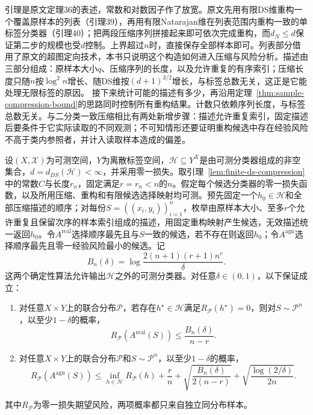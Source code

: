 引理是原文定理36的表述，常数和对数因子作了放宽。原文先用有限DS维重构一个覆盖原样本的列表（引理39），再用有限Natarajan维在列表范围内重构一致的单标签分类器（引理40）；把两段压缩序列拼接起来即可依次完成重构，而$d_N\leq d$保证第二步的规模也受$d$控制。上界超过$n$时，直接保存全部样本即可。列表部分借用了原文的超图定向技术，本书只说明这个构造如何进入压缩与风险分析。描述由三部分组成：原样本大小$q$、压缩序列的长度，以及允许重复的有序索引；压缩长度只随$n$按$\log^2n$增长、随DS维按$(d+1)^{3/2}$增长，与标签总数无关，这正是它能处理无限标签的原因。
接下来统计可能的描述有多少，再沿用定理~\ref{thm:sample-compression-bound}的思路同时控制所有重构结果。计数只依赖序列长度，与标签总数无关。与二分类一致压缩相比有两处新增步骤：描述允许重复索引，固定描述后要条件于它实际读取的不同观测；不可知情形还要证明重构候选中存在经验风险不高于类内参照者，并计入读取样本造成的偏差。

\begin{theorem}[有限DS维的期望风险保证]
\label{thm:finite-ds-learning-rates}
设$(X,\mathcal X)$为可测空间，$Y$为离散标签空间，$\mathcal H\subseteq Y^X$是由可测分类器组成的非空集合，$d=d_{DS}(\mathcal H)<\infty$，并采用零一损失。取引理~\ref{lem:finite-ds-compression}中的常数$C$与长度$r_n$，固定满足$r=r_n<n$的$n$。假定每个候选分类器的零一损失函数，以及所用压缩、重构和有限候选选择映射均可测。预先固定一个$h_0\in\mathcal H$和全部压缩描述的顺序；对每份$S=((x_i,y_i))_{i=1}^n$，枚举由原样本大小、至多$r$个允许重复且保留次序的样本索引组成的描述，用固定重构映射产生候选，无效描述统一返回$h_0$。令$A^{\mathrm{real}}$选择顺序最先且与$S$一致的候选，若不存在则返回$h_0$；令$A^{\mathrm{agn}}$选择顺序最先且零一经验风险最小的候选。记
\[
 B_n(\delta)=\log\frac{2(n+1)(r+1)n^r}{\delta}.
\]
这两个确定性算法允许输出$\mathcal H$之外的可测分类器。对任意$\delta\in(0,1)$，以下保证成立：
\begin{enumerate}
\item 对任意$X\times Y$上的联合分布$\mathcal P$，若存在$h^\star\in\mathcal H$满足$R_{\mathcal P}(h^\star)=0$，则对$S\sim\mathcal P^n$，以至少$1-\delta$的概率，
 \[
 R_{\mathcal P}(A^{\mathrm{real}}(S))\leq\frac{B_n(\delta)}{n-r}.
 \]
\item 对任意$X\times Y$上的联合分布$\mathcal P$和$S\sim\mathcal P^n$，以至少$1-\delta$的概率，
 \[
 R_{\mathcal P}(A^{\mathrm{agn}}(S))
 \leq\inf_{h\in\mathcal H}R_{\mathcal P}(h)+\frac rn
 +\sqrt{\frac{B_n(\delta)}{2(n-r)}}+\sqrt{\frac{\log(2/\delta)}{2n}}.
 \]
\end{enumerate}
其中$R_{\mathcal P}$为零一损失期望风险，两项概率都只来自独立同分布样本。
\end{theorem}

